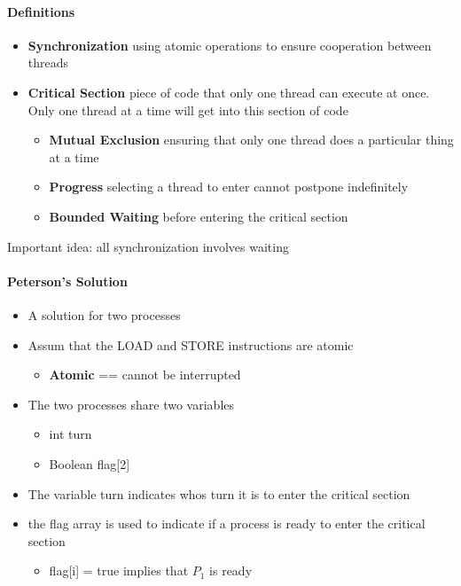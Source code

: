 \documentclass[titlepage]{article}
\newcommand*{\bluebold}[1]{\textbf{{\color{blue} #1}}}
\newcommand*{\orangebold}[1]{\textbf{{\color{Orange} #1}}}
\begin{document}
  \paragraph{Definitions}

  \begin{itemize}
    \item \bluebold{Synchronization} using atomic operations to ensure cooperation between threads
    \item \bluebold{Critical Section} piece of code that only one thread can execute at once. Only one thread at a time will get into this section of code
    \begin{itemize}
      \item \orangebold{Mutual Exclusion} ensuring that only one thread does a particular thing at a time
      \item \orangebold{Progress} selecting a thread to enter cannot postpone indefinitely
      \item \orangebold{Bounded Waiting} before entering the critical section
    \end{itemize}
  \end{itemize}

  {\color{blue} Important idea: all synchronization involves waiting}


  \paragraph{Peterson's Solution}

  \begin{itemize}
    \item A solution for two processes
    \item Assum that the LOAD and STORE instructions are atomic
    \begin{itemize}
      \item \textbf{Atomic} == cannot be interrupted
    \end{itemize}
    \item The two processes share two variables
    \begin{itemize}
      \item int {\color{red} turn}
      \item Boolean {\color{red} flag[2]}
    \end{itemize}
    \item The variable {\color{red} turn} indicates whos turn it is to enter the critical section
    \item the {\color{red} flag} array is used to indicate if a process is ready to enter the critical section
    \begin{itemize}
      \item {\color{red} flag[i] = true} implies that {\color{blue} $P_1$} is ready
    \end{itemize}
  \end{itemize}
\end{document}

